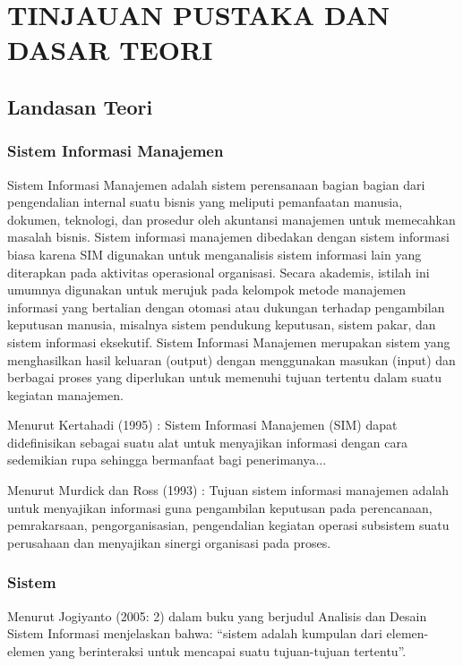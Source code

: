 \documentclass{jtetiproposalskripsi}
\begin{document}
\chapter{TINJAUAN PUSTAKA DAN DASAR TEORI}               
\section{Landasan Teori}
\subsection{Sistem Informasi Manajemen }
Sistem Informasi Manajemen adalah sistem perensanaan bagian bagian dari pengendalian internal suatu bisnis yang meliputi pemanfaatan manusia, dokumen, teknologi, dan prosedur oleh akuntansi manajemen untuk memecahkan masalah bisnis. Sistem informasi manajemen dibedakan dengan sistem informasi biasa karena SIM digunakan untuk menganalisis sistem informasi lain yang diterapkan pada aktivitas operasional organisasi. Secara akademis, istilah ini umumnya digunakan untuk merujuk pada kelompok metode manajemen informasi yang bertalian dengan otomasi atau dukungan terhadap pengambilan keputusan manusia, misalnya sistem pendukung keputusan, sistem pakar, dan sistem informasi eksekutif. Sistem Informasi Manajemen merupakan sistem yang menghasilkan hasil keluaran (output) dengan menggunakan masukan (input) dan berbagai proses yang diperlukan untuk memenuhi tujuan tertentu dalam suatu kegiatan manajemen.

Menurut Kertahadi (1995) : Sistem Informasi Manajemen (SIM) dapat didefinisikan sebagai suatu alat untuk menyajikan informasi dengan cara sedemikian rupa sehingga bermanfaat bagi penerimanya...
	
Menurut Murdick dan Ross  (1993) : Tujuan sistem informasi manajemen adalah untuk menyajikan informasi guna pengambilan keputusan pada perencanaan, pemrakarsaan, pengorganisasian, pengendalian kegiatan operasi subsistem suatu perusahaan dan menyajikan sinergi organisasi pada proses.

\subsection{Sistem}
Menurut Jogiyanto (2005: 2) dalam buku yang berjudul Analisis dan Desain Sistem Informasi menjelaskan bahwa: “sistem adalah kumpulan dari elemen-elemen yang berinteraksi untuk mencapai suatu tujuan-tujuan tertentu”.
\end{document}
